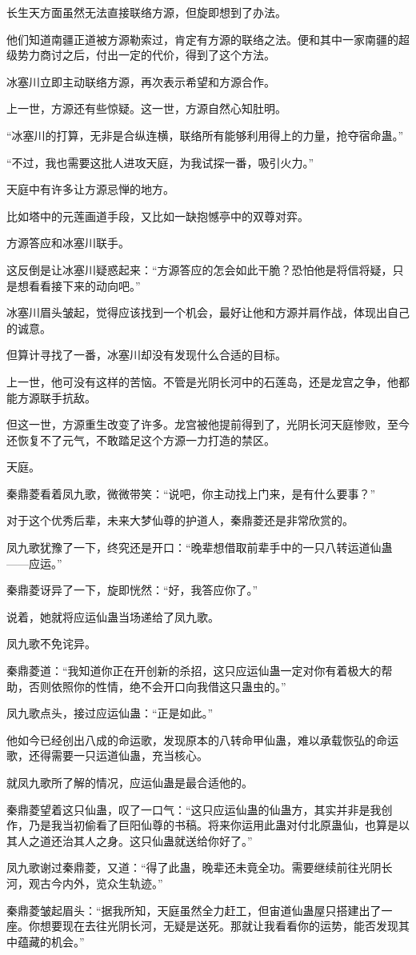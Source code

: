 \begin{this_body}
长生天方面虽然无法直接联络方源，但旋即想到了办法。

他们知道南疆正道被方源勒索过，肯定有方源的联络之法。便和其中一家南疆的超级势力商讨之后，付出一定的代价，得到了这个方法。

冰塞川立即主动联络方源，再次表示希望和方源合作。

上一世，方源还有些惊疑。这一世，方源自然心知肚明。

“冰塞川的打算，无非是合纵连横，联络所有能够利用得上的力量，抢夺宿命蛊。”

“不过，我也需要这批人进攻天庭，为我试探一番，吸引火力。”

天庭中有许多让方源忌惮的地方。

比如塔中的元莲画道手段，又比如一缺抱憾亭中的双尊对弈。

方源答应和冰塞川联手。

这反倒是让冰塞川疑惑起来：“方源答应的怎会如此干脆？恐怕他是将信将疑，只是想看看接下来的动向吧。”

冰塞川眉头皱起，觉得应该找到一个机会，最好让他和方源并肩作战，体现出自己的诚意。

但算计寻找了一番，冰塞川却没有发现什么合适的目标。

上一世，他可没有这样的苦恼。不管是光阴长河中的石莲岛，还是龙宫之争，他都能方源联手抗敌。

但这一世，方源重生改变了许多。龙宫被他提前得到了，光阴长河天庭惨败，至今还恢复不了元气，不敢踏足这个方源一力打造的禁区。

天庭。

秦鼎菱看着凤九歌，微微带笑：“说吧，你主动找上门来，是有什么要事？”

对于这个优秀后辈，未来大梦仙尊的护道人，秦鼎菱还是非常欣赏的。

凤九歌犹豫了一下，终究还是开口：“晚辈想借取前辈手中的一只八转运道仙蛊——应运。”

秦鼎菱讶异了一下，旋即恍然：“好，我答应你了。”

说着，她就将应运仙蛊当场递给了凤九歌。

凤九歌不免诧异。

秦鼎菱道：“我知道你正在开创新的杀招，这只应运仙蛊一定对你有着极大的帮助，否则依照你的性情，绝不会开口向我借这只蛊虫的。”

凤九歌点头，接过应运仙蛊：“正是如此。”

他如今已经创出八成的命运歌，发现原本的八转命甲仙蛊，难以承载恢弘的命运歌，还得需要一只运道仙蛊，充当核心。

就凤九歌所了解的情况，应运仙蛊是最合适他的。

秦鼎菱望着这只仙蛊，叹了一口气：“这只应运仙蛊的仙蛊方，其实并非是我创作，乃是我当初偷看了巨阳仙尊的书稿。将来你运用此蛊对付北原蛊仙，也算是以其人之道还治其人之身。这只仙蛊就送给你好了。”

凤九歌谢过秦鼎菱，又道：“得了此蛊，晚辈还未竟全功。需要继续前往光阴长河，观古今内外，览众生轨迹。”

秦鼎菱皱起眉头：“据我所知，天庭虽然全力赶工，但宙道仙蛊屋只搭建出了一座。你想要现在去往光阴长河，无疑是送死。那就让我看看你的运势，能否发现其中蕴藏的机会。”

\end{this_body}

